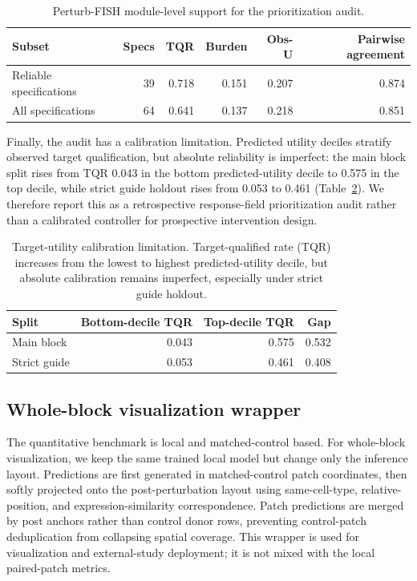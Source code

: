 \documentclass[sigconf,review,balance=false]{acmart}
\begin{document}
\begin{table}[t]
\centering
\scriptsize
\caption{Perturb-FISH module-level support for the prioritization audit.}
\label{tab:app_selector_perturb_fish}
\setlength{\tabcolsep}{3pt}
\begin{tabular}{@{}lrrrrr@{}}
\toprule
Subset & Specs & TQR & Burden & Obs-U & Pairwise agreement \\
\midrule
Reliable specifications & 39 & 0.718 & 0.151 & 0.207 & 0.874 \\
All specifications & 64 & 0.641 & 0.137 & 0.218 & 0.851 \\
\bottomrule
\end{tabular}
\end{table}

Finally, the audit has a calibration limitation. Predicted utility deciles
stratify observed target qualification, but absolute reliability is imperfect:
the main block split rises from TQR 0.043 in the bottom predicted-utility decile
to 0.575 in the top decile, while strict guide holdout rises from 0.053 to
0.461 (Table~\ref{tab:app_selector_calibration}). We therefore report this as a
retrospective response-field prioritization audit rather than a calibrated
controller for prospective intervention design.

\begin{table}[t]
\centering
\small
\caption{Target-utility calibration limitation. Target-qualified rate (TQR)
increases from the lowest to highest predicted-utility decile, but absolute
calibration remains imperfect, especially under strict guide holdout.}
\label{tab:app_selector_calibration}
\begin{tabular}{lrrr}
\toprule
Split & Bottom-decile TQR & Top-decile TQR & Gap \\
\midrule
Main block & 0.043 & 0.575 & 0.532 \\
Strict guide & 0.053 & 0.461 & 0.408 \\
\bottomrule
\end{tabular}
\end{table}

\subsection{Whole-block visualization wrapper}
\label{app:whole_block_wrapper}

The quantitative benchmark is local and matched-control based. For whole-block visualization, we keep the same trained local model but change only the inference layout. Predictions are first generated in matched-control patch coordinates, then softly projected onto the post-perturbation layout using same-cell-type, relative-position, and expression-similarity correspondence. Patch predictions are merged by post anchors rather than control donor rows, preventing control-patch deduplication from collapsing spatial coverage. This wrapper is used for visualization and external-study deployment; it is not mixed with the local paired-patch metrics.
\end{document}
